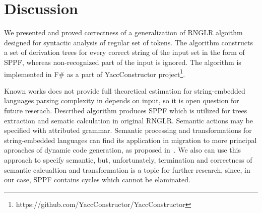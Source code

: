 \section{Discussion}
%
We presented and proved correctness of a generalization of RNGLR algoithm designed for syntactic analysis of regular set of
tokens. The algorithm constructs a set of derivation trees for every correct string of the input
set in the form of SPPF, whereas non-recognized part of the input is ignored. The algorithm is 
implemented in F\# as a part of YaccConstructor project\footnote{https://github.com/YaccConstructor/YaccConstructor}.

Known works does not provide full theoretical estimation for string-embedded languages parsing complexity in depends on input, so it is open question for future reserach.
Described algorithm produces SPPF which is utilized for trees extraction and sematic calculation in original RNGLR. Semantic actions may be specified with attributed grammar.
Semantic processing and transformations for string-embedded languages can find its application in migration to more principal aproaches of dynamic code generation, as proposed in~\cite{EvalToStaged}.
We also can use this approach to specify semantic, but, unfortunately, termination and correctness of semantic calcualtion and transformation is a topic for further research, 
since, in our case, SPPF contains cycles which cannot be elaminated. 

